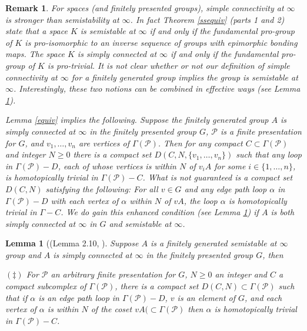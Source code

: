 \documentclass[12pt]{article}
\newtheorem{lemma}[theorem]{Lemma}
\newtheorem{remark}[theorem]{Remark}
\begin{document}
\begin{remark} \label{R1}
For spaces (and finitely presented groups), simple connectivity at $\infty$ is stronger than semistability at $\infty$. In fact  Theorem \ref{ssequiv} (parts 1 and 2) state that a space $K$ is semistable at $\infty$ if and only if the fundamental pro-group of $K$ is pro-isomorphic to an inverse sequence of groups with epimorphic bonding maps. The space $K$ is simply connected at $\infty$ if and only if the fundamental pro-group of $K$ is pro-trivial. 
It is not clear whether or not our definition of simple connectivity at $\infty$ for a finitely generated group implies the group is semistable at $\infty$. Interestingly, these two notions can be combined in effective ways (see Lemma \ref{ss+sc}). 

Lemma \ref{equiv} implies the following. Suppose the finitely generated group $A$ is simply connected at $\infty$ in the finitely presented group $G$, $\mathcal P$ is a finite presentation for $G$, and  $v_1,\ldots, v_n$ are vertices of $\Gamma (\mathcal P)$. Then for any compact $C\subset \Gamma (\mathcal P)$ and integer $N\geq 0$ there is a compact set $D(C,N,\{v_1,\ldots ,v_n\})$ such that any loop in $\Gamma (\mathcal P)-D$, each of whose vertices is within $N$ of $v_iA$ for some $i\in \{1,\ldots ,n\}$, is homotopically trivial in $\Gamma (\mathcal P)-C$. 
What is not guaranteed is a compact set $D(C,N)$ satisfying the following: For all $v\in G$ and any edge path loop $\alpha$ in $\Gamma (\mathcal P)-D$ with each vertex of $\alpha$  within $N$ of $vA$, the loop $\alpha$ is homotopically trivial in $\Gamma-C$. We do gain this enhanced condition (see Lemma \ref{ss+sc}) if $A$ is both simply connected at $\infty$ in $G$ and semistable at $\infty$.
\end{remark}

\begin{lemma} [(Lemma 2.10, \cite{M6}] \label{ss+sc} 
Suppose $A$ is a finitely generated semistable at $\infty$ group and $A$ is simply connected at $\infty $ in the finitely presented group $G$, then

\noindent $(\ddagger)$ For $\mathcal P$ an arbitrary finite presentation for $G$, $N\geq 0$ an integer and $C$ a compact subcomplex of $\Gamma (\mathcal P)$, there is a compact set $D(C,N)\subset \Gamma (\mathcal P)$ such that if $\alpha$ is an edge path loop in $\Gamma (\mathcal P)-D$, $v$ is an element of $G$, and each vertex of $\alpha$ is within $N$ of the coset $vA(\subset \Gamma (\mathcal P)$ then $\alpha$ is homotopically trivial in $\Gamma (\mathcal P)-C$. 
\end{lemma} 
\end{document}
